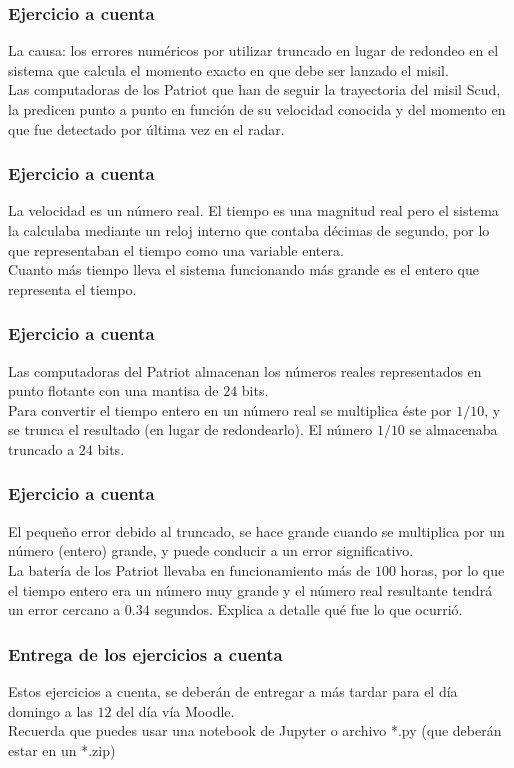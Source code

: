 \documentclass[12pt]{beamer}
\begin{document}
\begin{frame}
\frametitle{Ejercicio a cuenta}
La causa: los errores numéricos por utilizar truncado en lugar de redondeo en el sistema que calcula el momento exacto en que debe ser lanzado el misil.
\\
\bigskip
\pause
Las computadoras de los Patriot que han de seguir la trayectoria del misil Scud, la predicen punto a punto en función de su velocidad conocida y del momento en que fue detectado por última vez en el radar.
\end{frame}
\begin{frame}
\frametitle{Ejercicio a cuenta}
La velocidad es un número real. El tiempo es una magnitud real pero el sistema la calculaba mediante un reloj interno que contaba décimas de segundo, por lo que representaban el tiempo como una variable entera.
\\
\bigskip
\pause
Cuanto más tiempo lleva el sistema funcionando más grande es el entero que representa el tiempo.
\end{frame}
\begin{frame}
\frametitle{Ejercicio a cuenta}
Las computadoras del Patriot almacenan los números reales representados en punto flotante con una mantisa de $24$ bits.
\\
\bigskip
\pause
Para convertir el tiempo entero en un número real se multiplica éste por $1/10$, y se trunca el resultado (en lugar de redondearlo). El número $1/10$ se almacenaba truncado a $24$ bits.
\end{frame}
\begin{frame}
\frametitle{Ejercicio a cuenta}
El pequeño error debido al truncado, se hace grande cuando se multiplica por un número (entero) grande, y puede conducir a un error significativo.
\\
\bigskip
La batería de los Patriot llevaba en funcionamiento más de $100$ horas, por lo que el tiempo entero era un número muy grande y el número real resultante tendrá un error cercano a $0.34$ segundos. \pause Explica a detalle qué fue lo que ocurrió.
\end{frame}
\begin{frame}
\frametitle{Entrega de los ejercicios a cuenta}
Estos ejercicios a cuenta, se deberán de entregar a más tardar para el día domingo a las $12$ del día vía Moodle.
\\
\bigskip
Recuerda que puedes usar una notebook de Jupyter o archivo *.py (que deberán estar en un *.zip)
\end{frame}
\end{document}
